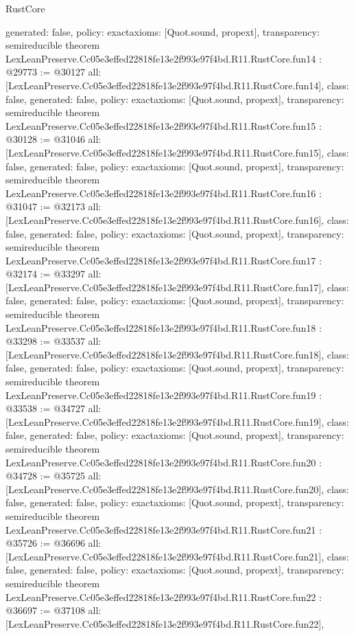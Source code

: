 \begin{lexlean}{RustCore}
\begin{coremodule}
{  generated: false,
  policy: exact{axioms: [Quot.sound, propext]},
  transparency: semireducible
}
theorem LexLeanPreserve.Cc05e3effed22818fe13e2f993e97f4bd.R11.RustCore.fun14 : @29773 := @30127 {
  all: [LexLeanPreserve.Cc05e3effed22818fe13e2f993e97f4bd.R11.RustCore.fun14],
  class: false,
  generated: false,
  policy: exact{axioms: [Quot.sound, propext]},
  transparency: semireducible
}
theorem LexLeanPreserve.Cc05e3effed22818fe13e2f993e97f4bd.R11.RustCore.fun15 : @30128 := @31046 {
  all: [LexLeanPreserve.Cc05e3effed22818fe13e2f993e97f4bd.R11.RustCore.fun15],
  class: false,
  generated: false,
  policy: exact{axioms: [Quot.sound, propext]},
  transparency: semireducible
}
theorem LexLeanPreserve.Cc05e3effed22818fe13e2f993e97f4bd.R11.RustCore.fun16 : @31047 := @32173 {
  all: [LexLeanPreserve.Cc05e3effed22818fe13e2f993e97f4bd.R11.RustCore.fun16],
  class: false,
  generated: false,
  policy: exact{axioms: [Quot.sound, propext]},
  transparency: semireducible
}
theorem LexLeanPreserve.Cc05e3effed22818fe13e2f993e97f4bd.R11.RustCore.fun17 : @32174 := @33297 {
  all: [LexLeanPreserve.Cc05e3effed22818fe13e2f993e97f4bd.R11.RustCore.fun17],
  class: false,
  generated: false,
  policy: exact{axioms: [Quot.sound, propext]},
  transparency: semireducible
}
theorem LexLeanPreserve.Cc05e3effed22818fe13e2f993e97f4bd.R11.RustCore.fun18 : @33298 := @33537 {
  all: [LexLeanPreserve.Cc05e3effed22818fe13e2f993e97f4bd.R11.RustCore.fun18],
  class: false,
  generated: false,
  policy: exact{axioms: [Quot.sound, propext]},
  transparency: semireducible
}
theorem LexLeanPreserve.Cc05e3effed22818fe13e2f993e97f4bd.R11.RustCore.fun19 : @33538 := @34727 {
  all: [LexLeanPreserve.Cc05e3effed22818fe13e2f993e97f4bd.R11.RustCore.fun19],
  class: false,
  generated: false,
  policy: exact{axioms: [Quot.sound, propext]},
  transparency: semireducible
}
theorem LexLeanPreserve.Cc05e3effed22818fe13e2f993e97f4bd.R11.RustCore.fun20 : @34728 := @35725 {
  all: [LexLeanPreserve.Cc05e3effed22818fe13e2f993e97f4bd.R11.RustCore.fun20],
  class: false,
  generated: false,
  policy: exact{axioms: [Quot.sound, propext]},
  transparency: semireducible
}
theorem LexLeanPreserve.Cc05e3effed22818fe13e2f993e97f4bd.R11.RustCore.fun21 : @35726 := @36696 {
  all: [LexLeanPreserve.Cc05e3effed22818fe13e2f993e97f4bd.R11.RustCore.fun21],
  class: false,
  generated: false,
  policy: exact{axioms: [Quot.sound, propext]},
  transparency: semireducible
}
theorem LexLeanPreserve.Cc05e3effed22818fe13e2f993e97f4bd.R11.RustCore.fun22 : @36697 := @37108 {
  all: [LexLeanPreserve.Cc05e3effed22818fe13e2f993e97f4bd.R11.RustCore.fun22],
}
\end{coremodule}
\end{lexlean}
